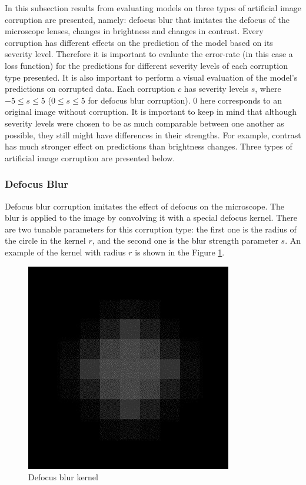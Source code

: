 
In this subsection results from evaluating models on three types of artificial image corruption are presented, namely: defocus blur that imitates the defocus of the microscope lenses, changes in brightness and changes in contrast. Every corruption  has different effects on the prediction of the model based on its severity level. Therefore it is important to evaluate the error-rate (in this case a loss function) for the predictions for different severity levels of each corruption type presented. It is also important to perform a visual evaluation of the model's predictions on corrupted data. Each corruption $c$ has severity levels $s$, where $-5 \leq s \leq 5$ ($0 \leq s \leq 5$ for defocus blur corruption). $0$ here corresponds to an original image without corruption. It is important to keep in mind that although severity levels were chosen to be as much comparable between one another as possible, they still might have differences in their strengths. For example, contrast has much stronger effect on predictions than brightness changes. Three types of artificial image corruption are presented below.

\subsubsection{Defocus Blur}
\label{section:defocus-blur}
Defocus blur corruption imitates the effect of defocus on the microscope. The blur is applied to the image by convolving it with a special defocus kernel. There are two tunable parameters for this corruption type: the first one is the radius of the circle in the kernel $r$, and the second one is the blur strength parameter $s$. An example of the kernel with radius $r$ is shown in the Figure \ref{fig:defocus-blur-kernel}.

\begin{figure}[htb]
	\begin{center}
		\includegraphics[width=0.2\linewidth]{bilder/stability/defocus-blur-kernel.png}
		\caption{Defocus blur kernel}\label{fig:defocus-blur-kernel}
	\end{center}
\end{figure}

